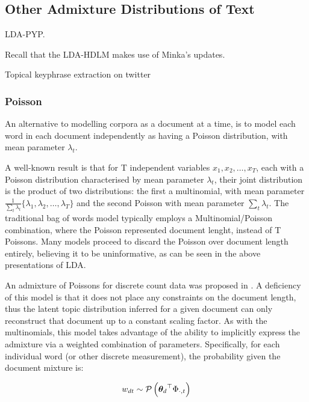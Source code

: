 

\subsection{Other Admixture Distributions of Text}


LDA-PYP\cite{Lindsey2012}. 

Recall that the LDA-HDLM\cite{Wallach2006} makes use of Minka's\cite{Minka2000} updates.

Topical keyphrase extraction on twitter\cite{Zhao2011a}

\subsubsection{Poisson}
An alternative to modelling corpora as a document at a time, is to model each word in each document independently as having a Poisson distribution, with mean parameter $\lambda_t$. 

A well-known result\cite{Bishop2006}\cite{Inouye2014} is that for T independent variables $x_1, x_2, \ldots, x_T$, each with a Poisson distribution characterised by mean parameter $\lambda_t$, their joint distribution is the product of two distributions: the first a multinomial, with mean parameter $\frac{1}{\sum_t \lambda_t} \{\lambda_1, \lambda_2, \ldots, \lambda_T\}$ and the second Poisson with mean parameter $\sum_t \lambda_t$. The traditional bag of words model typically employs a Multinomial/Poisson combination, where the Poisson represented document lenght, instead of T Poissons. Many models proceed to discard the Poisson over document length entirely, believing it to be uninformative, as can be seen in the above presentations of LDA.

An admixture of Poissons for discrete count data was proposed in \cite{Gopalan2013}. A deficiency of this model is that it does not place any constraints on the document length, thus the latent topic distribution inferred for a given document can only reconstruct that document up to a constant scaling factor. As with the multinomials, this model takes advantage of the ability to implicitly express the admixture via a weighted combination of parameters. Specifically, for each individual word (or other discrete measurement), the probability given the document mixture is:

\begin{align}
w_{dt} \sim \mathcal{P} \left( {{ \bm \theta_d }^\top\Phi_{\cdot,t}} \right)
\end{align}

